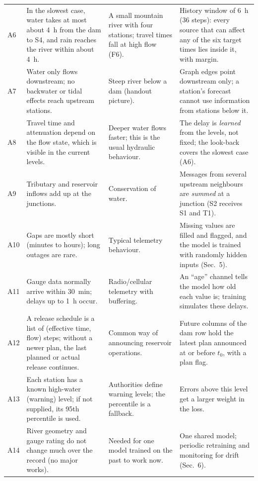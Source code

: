 \begin{longtable}{@{}p{0.6cm}p{4.9cm}p{5.0cm}p{4.9cm}@{}}
A6 & In the slowest case, water takes at most about 4~h from the dam to S4, and rain reaches the river within about 4~h. & A small mountain river with four stations; travel times fall at high flow (F6). & History window of 6~h (36 steps): every source that can affect any of the six target times lies inside it, with margin. \\
A7 & Water only flows downstream; no backwater or tidal effects reach upstream stations. & Steep river below a dam (handout picture). & Graph edges point downstream only; a station's forecast cannot use information from stations below it. \\
A8 & Travel time and attenuation depend on the flow state, which is visible in the current levels. & Deeper water flows faster; this is the usual hydraulic behaviour. & The delay is \emph{learned} from the levels, not fixed; the look-back covers the slowest case (A6). \\
A9 & Tributary and reservoir inflows add up at the junctions. & Conservation of water. & Messages from several upstream neighbours are \emph{summed} at a junction (S2 receives S1 and T1). \\
A10 & Gaps are mostly short (minutes to hours); long outages are rare. & Typical telemetry behaviour. & Missing values are filled and flagged, and the model is trained with randomly hidden inputs (Sec.~5). \\
A11 & Gauge data normally arrive within 30~min; delays up to 1~h occur. & Radio/cellular telemetry with buffering. & An ``age'' channel tells the model how old each value is; training simulates these delays. \\
A12 & A release schedule is a list of (effective time, flow) steps; without a newer plan, the last planned or actual release continues. & Common way of announcing reservoir operations. & Future columns of the dam row hold the latest plan announced at or before $t_0$, with a plan flag. \\
A13 & Each station has a known high-water (warning) level; if not supplied, its 95th percentile is used. & Authorities define warning levels; the percentile is a fallback. & Errors above this level get a larger weight in the loss. \\
A14 & River geometry and gauge rating do not change much over the record (no major works). & Needed for one model trained on the past to work now. & One shared model; periodic retraining and monitoring for drift (Sec.~6). \\
\bottomrule
\end{longtable}

